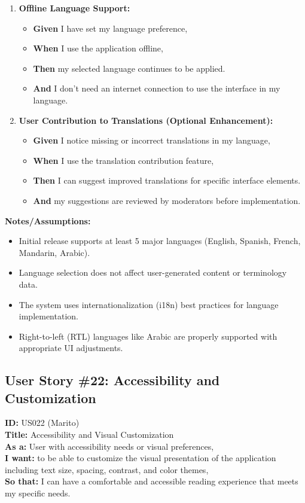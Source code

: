 \documentclass[12pt]{article}
\begin{document}
\begin{enumerate}
    \item \textbf{Offline Language Support:}
    \begin{itemize}
        \item \textbf{Given} I have set my language preference,
        \item \textbf{When} I use the application offline,
        \item \textbf{Then} my selected language continues to be applied.
        \item \textbf{And} I don't need an internet connection to use the interface in my language.
    \end{itemize}

    \item \textbf{User Contribution to Translations (Optional Enhancement):}
    \begin{itemize}
        \item \textbf{Given} I notice missing or incorrect translations in my language,
        \item \textbf{When} I use the translation contribution feature,
        \item \textbf{Then} I can suggest improved translations for specific interface elements.
        \item \textbf{And} my suggestions are reviewed by moderators before implementation.
    \end{itemize}
\end{enumerate}

\vspace{1em}
\textbf{Notes/Assumptions:}
\begin{itemize}
    \item Initial release supports at least 5 major languages (English, Spanish, French, Mandarin, Arabic).
    \item Language selection does not affect user-generated content or terminology data.
    \item The system uses internationalization (i18n) best practices for language implementation.
    \item Right-to-left (RTL) languages like Arabic are properly supported with appropriate UI adjustments.
\end{itemize}


\subsection{User Story \#22: Accessibility and Customization}
\textbf{ID:} US022 (Marito) \\
\textbf{Title:} Accessibility and Visual Customization \\
\textbf{As a:} User with accessibility needs or visual preferences, \\
\textbf{I want:} to be able to customize the visual presentation of the application including text size, spacing, contrast, and color themes, \\
\textbf{So that:} I can have a comfortable and accessible reading experience that meets my specific needs.
\end{document}
